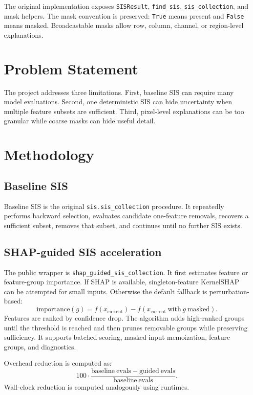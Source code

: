 \documentclass[11pt]{article}
\begin{document}
The original implementation exposes \texttt{SISResult}, \texttt{find\_sis}, \texttt{sis\_collection}, and mask helpers. The mask convention is preserved: \texttt{True} means present and \texttt{False} means masked. Broadcastable masks allow row, column, channel, or region-level explanations.

\section{Problem Statement}
The project addresses three limitations. First, baseline SIS can require many model evaluations. Second, one deterministic SIS can hide uncertainty when multiple feature subsets are sufficient. Third, pixel-level explanations can be too granular while coarse masks can hide useful detail.

\section{Methodology}
\subsection{Baseline SIS}
Baseline SIS is the original \texttt{sis.sis\_collection} procedure. It repeatedly performs backward selection, evaluates candidate one-feature removals, recovers a sufficient subset, removes that subset, and continues until no further SIS exists.

\subsection{SHAP-guided SIS acceleration}
The public wrapper is \texttt{shap\_guided\_sis\_collection}. It first estimates feature or feature-group importance. If SHAP is available, singleton-feature KernelSHAP can be attempted for small inputs. Otherwise the default fallback is perturbation-based:
\[
\mathrm{importance}(g) = f(x_{\mathrm{current}}) - f(x_{\mathrm{current}}\ \mathrm{with}\ g\ \mathrm{masked}).
\]
Features are ranked by confidence drop. The algorithm adds high-ranked groups until the threshold is reached and then prunes removable groups while preserving sufficiency. It supports batched scoring, masked-input memoization, feature groups, and diagnostics.

Overhead reduction is computed as:
\[
100 \cdot \frac{\mathrm{baseline\ evals} - \mathrm{guided\ evals}}{\mathrm{baseline\ evals}}.
\]
Wall-clock reduction is computed analogously using runtimes.
\end{document}
